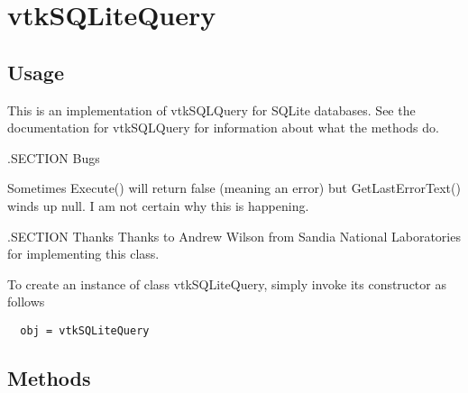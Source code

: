 \section{vtkSQLiteQuery}

\subsection{Usage}


 This is an implementation of vtkSQLQuery for SQLite databases.  See
 the documentation for vtkSQLQuery for information about what the
 methods do.

 .SECTION Bugs

 Sometimes Execute() will return false (meaning an error) but
 GetLastErrorText() winds up null.  I am not certain why this is
 happening.

 .SECTION Thanks
 Thanks to Andrew Wilson from Sandia National Laboratories for implementing
 this class.


To create an instance of class vtkSQLiteQuery, simply
invoke its constructor as follows
\begin{verbatim}
  obj = vtkSQLiteQuery
\end{verbatim}
\subsection{Methods}

